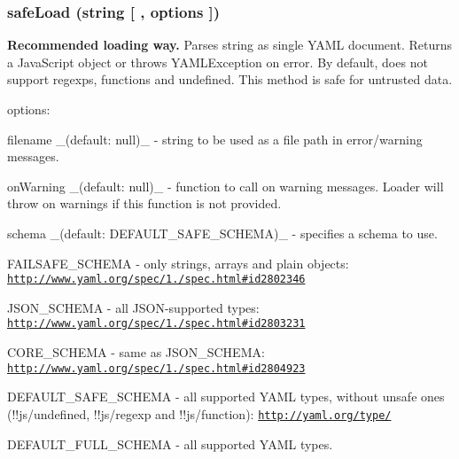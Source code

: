 \subsubsection*{safe\+Load (string \mbox{[} , options \mbox{]})}

{\bfseries Recommended loading way.} Parses {\ttfamily string} as single Y\+A\+M\+L document. Returns a Java\+Script object or throws {\ttfamily Y\+A\+M\+L\+Exception} on error. By default, does not support regexps, functions and undefined. This method is safe for untrusted data.

options\+:


\begin{DoxyItemize}
\item {\ttfamily filename} \+\_\+(default\+: null)\+\_\+ -\/ string to be used as a file path in error/warning messages.
\item {\ttfamily on\+Warning} \+\_\+(default\+: null)\+\_\+ -\/ function to call on warning messages. Loader will throw on warnings if this function is not provided.
\item {\ttfamily schema} \+\_\+(default\+: {\ttfamily D\+E\+F\+A\+U\+L\+T\+\_\+\+S\+A\+F\+E\+\_\+\+S\+C\+H\+E\+M\+A})\+\_\+ -\/ specifies a schema to use.
\begin{DoxyItemize}
\item {\ttfamily F\+A\+I\+L\+S\+A\+F\+E\+\_\+\+S\+C\+H\+E\+M\+A} -\/ only strings, arrays and plain objects\+: \href{http://www.yaml.org/spec/1.2/spec.html#id2802346}{\tt http\+://www.\+yaml.\+org/spec/1./spec.\+html\#id2802346}
\item {\ttfamily J\+S\+O\+N\+\_\+\+S\+C\+H\+E\+M\+A} -\/ all J\+S\+O\+N-\/supported types\+: \href{http://www.yaml.org/spec/1.2/spec.html#id2803231}{\tt http\+://www.\+yaml.\+org/spec/1./spec.\+html\#id2803231}
\item {\ttfamily C\+O\+R\+E\+\_\+\+S\+C\+H\+E\+M\+A} -\/ same as {\ttfamily J\+S\+O\+N\+\_\+\+S\+C\+H\+E\+M\+A}\+: \href{http://www.yaml.org/spec/1.2/spec.html#id2804923}{\tt http\+://www.\+yaml.\+org/spec/1./spec.\+html\#id2804923}
\item {\ttfamily D\+E\+F\+A\+U\+L\+T\+\_\+\+S\+A\+F\+E\+\_\+\+S\+C\+H\+E\+M\+A} -\/ all supported Y\+A\+M\+L types, without unsafe ones ({\ttfamily !!js/undefined}, {\ttfamily !!js/regexp} and {\ttfamily !!js/function})\+: \href{http://yaml.org/type/}{\tt http\+://yaml.\+org/type/}
\item {\ttfamily D\+E\+F\+A\+U\+L\+T\+\_\+\+F\+U\+L\+L\+\_\+\+S\+C\+H\+E\+M\+A} -\/ all supported Y\+A\+M\+L types.
\end{DoxyItemize}
\end{DoxyItemize}

